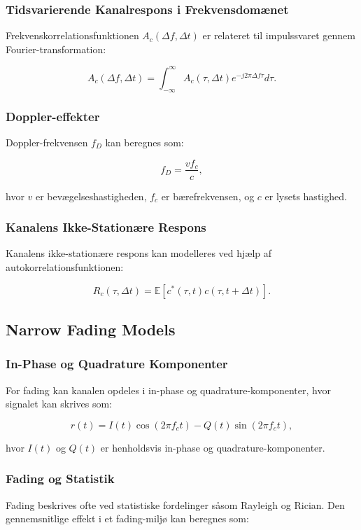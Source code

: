 \documentclass[a4paper,12pt]{book}
\begin{document}
	\subsubsection{Tidsvarierende Kanalrespons i Frekvensdomænet}
	Frekvenskorrelationsfunktionen \( A_c(\Delta f, \Delta t) \) er relateret til impulssvaret gennem Fourier-transformation:
	
	\[
	A_c(\Delta f, \Delta t) = \int_{-\infty}^{\infty} A_c(\tau, \Delta t) e^{-j 2 \pi \Delta f \tau} d\tau.
	\]
	
	\subsubsection{Doppler-effekter}
	Doppler-frekvensen \( f_D \) kan beregnes som:
	
	\[
	f_D = \frac{v f_c}{c},
	\]
	
	hvor \( v \) er bevægelseshastigheden, \( f_c \) er bærefrekvensen, og \( c \) er lysets hastighed.
	
	\subsubsection{Kanalens Ikke-Stationære Respons}
	Kanalens ikke-stationære respons kan modelleres ved hjælp af autokorrelationsfunktionen:
	
	\[
	R_c(\tau, \Delta t) = \mathbb{E}[c^*(\tau, t) c(\tau, t + \Delta t)].
	\]
	
	\subsection{Narrow Fading Models}
	\subsubsection{In-Phase og Quadrature Komponenter}
	For fading kan kanalen opdeles i in-phase og quadrature-komponenter, hvor signalet kan skrives som:
	
	\[
	r(t) = I(t) \cos(2 \pi f_c t) - Q(t) \sin(2 \pi f_c t),
	\]
	
	hvor \( I(t) \) og \( Q(t) \) er henholdsvis in-phase og quadrature-komponenter.
	
	\subsubsection{Fading og Statistik}
	Fading beskrives ofte ved statistiske fordelinger såsom Rayleigh og Rician. Den gennemsnitlige effekt i et fading-miljø kan beregnes som:
	
\end{document}
